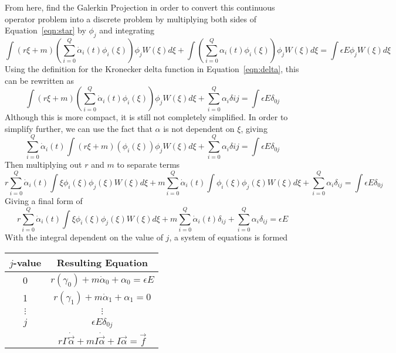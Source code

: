 \documentclass[12pt,letterpaper]{article}
\begin{document}
From here, find the Galerkin Projection in order to convert this continuous operator problem into a discrete problem by multiplying both sides of Equation~\ref{eqn:star} by $\phi_j$ and integrating
\begin{equation}
\int(r \xi + m)\left(\sum_{i=0}^{Q} \dot{\alpha}_i (t) \phi_i (\xi)\right) \phi_j W(\xi) d\xi +
\int \left( \sum_{i=0}^{Q} \alpha_i (t) \phi_i (\xi)\right)\phi_j W(\xi) d\xi = \int \epsilon E \phi_j W(\xi) d\xi
\end{equation}
Using the definition for the Kronecker delta function in Equation~\ref{eqn:delta}, this can be rewritten as
\begin{equation}
\int(r \xi + m)\left(\sum_{i=0}^{Q} \dot{\alpha}_i (t) \phi_i (\xi)\right) \phi_j W(\xi) d\xi + 
\sum_{i=0}^{Q} \alpha_i \delta{ij} = \int \epsilon E \delta_{0j}
\end{equation}
Although this is more compact, it is still not completely simplified. In order to simplify further, we can use the fact that $\alpha$ is not dependent on $\xi$, giving
\begin{equation}
\sum_{i=0}^{Q} \dot{\alpha}_i (t)\int(r \xi + m)\left( \phi_i (\xi)\right) \phi_j W(\xi) d\xi + 
\sum_{i=0}^{Q} \alpha_i \delta{ij} = \int \epsilon E \delta_{0j}
\end{equation}
Then multiplying out $r$ and $m$ to separate terms
\begin{equation}
r\sum_{i=0}^{Q} \dot{\alpha}_i (t) \int \xi \phi_i (\xi) \phi_j (\xi) W(\xi) d\xi +  m \sum_{i=0}^{Q} \dot{\alpha}_i (t) \int \phi_i (\xi) \phi_j (\xi) W(\xi) d\xi + 
\sum_{i=0}^{Q} \alpha_i \delta_{ij} = \int \epsilon E \delta_{0j}
\end{equation}
Giving a final form of
\begin{equation}
r\sum_{i=0}^{Q} \dot{\alpha}_i (t) \int \xi \phi_i (\xi) \phi_j (\xi) W(\xi) d\xi +  m \sum_{i=0}^{Q} \dot{\alpha}_i (t) \delta_{ij}+ 
\sum_{i=0}^{Q} \alpha_i \delta_{ij} = \epsilon E
\end{equation}
With the integral dependent on the value of $j$, a system of equations is formed
\begin{table}[H]
\centering
\begin{tabular}{c c}\toprule
$j$-value	& Resulting Equation \\\midrule
0			& $r (\gamma_0) + m \dot{\alpha}_0 + \alpha_0 = \epsilon E$\\
1			& $r (\gamma_1) + m \dot{\alpha}_1 + \alpha_1 = 0$\\
$\vdots$	& $\vdots$ \\
$j$			& $\epsilon E \delta_{0j}$ \\
			& $r\Gamma\dot{\vec{\alpha}} + mI\dot{\vec{\alpha}} + I \vec{\alpha} = \vec{f}$\\\bottomrule
\end{tabular}
\end{table}
\end{document}
